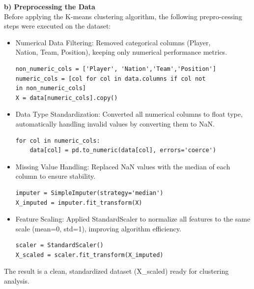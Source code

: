 \documentclass[a4paper,12pt]{article}
\begin{document}
\textbf{b) Preprocessing the Data} \\
Before applying the K-means clustering algorithm, the following prepro-cessing steps were executed on the dataset:
\begin{itemize}
    \item Numerical Data Filtering: Removed categorical columns (Player,\\ 
    Nation, Team, Position), keeping only numerical performance metrics.
    \begin{mdframed}
    \begin{verbatim}
non_numeric_cols = ['Player', 'Nation','Team','Position']
numeric_cols = [col for col in data.columns if col not
in non_numeric_cols]
X = data[numeric_cols].copy()
    \end{verbatim}
    \end{mdframed}
    \item Data Type Standardization: Converted all numerical columns to float type, automatically handling invalid values by converting them to NaN.
     \begin{mdframed}
    \begin{verbatim}
for col in numeric_cols:
    data[col] = pd.to_numeric(data[col], errors='coerce')
    \end{verbatim}
    \end{mdframed}
    \item Missing Value Handling: Replaced NaN values with the median of each column to ensure stability.
    \begin{mdframed}
    \begin{verbatim}
imputer = SimpleImputer(strategy='median')
X_imputed = imputer.fit_transform(X)
    \end{verbatim}
    \end{mdframed}
    \item Feature Scaling: Applied StandardScaler to normalize all features to the same scale (mean=0, std=1), improving algorithm efficiency.
    \begin{mdframed}
    \begin{verbatim}
scaler = StandardScaler()
X_scaled = scaler.fit_transform(X_imputed)
    \end{verbatim}
    \end{mdframed}
\end{itemize}
The result is a clean, standardized dataset (X\_scaled) ready for clustering analysis.
\end{document}
